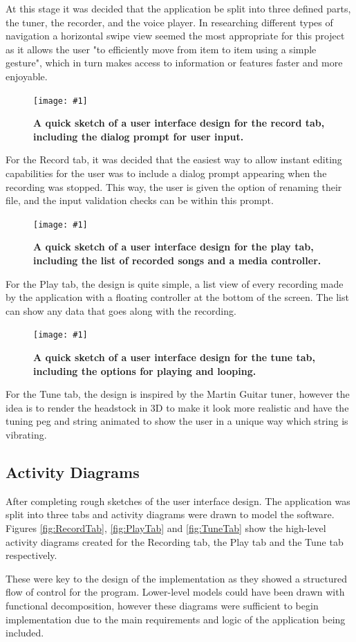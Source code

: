 \documentclass[conference]{acmsiggraph}
\newcommand{\figuremacroF}[3]{
	\begin{figure}[H] %
		\centering
		\texttt{[image: \#1]}
		\caption[#2]{\textbf{#2}}
		\label{fig:#1}
	\end{figure}
}
\begin{document}
At this stage it was decided that the application be split into three defined parts, the tuner, the recorder, and the voice player. In researching different types of navigation a horizontal swipe view seemed the most appropriate for this project as it allows the user "to efficiently move from item to item using a simple gesture", which in turn makes access to information or features faster and more enjoyable. \cite{swipeArticle}

\figuremacroF
{recordSketch}
{A quick sketch of a user interface design for the record tab, including the dialog prompt for user input.}
{1.0}

For the Record tab, it was decided that the easiest way to allow instant editing capabilities for the user was to include a dialog prompt appearing when the recording was stopped. This way, the user is given the option of renaming their file, and the input validation checks can be within this prompt. 

\figuremacroF
{playSketch}
{A quick sketch of a user interface design for the play tab, including the list of recorded songs and a media controller.}
{1.0}

For the Play tab, the design is quite simple, a list view of every recording made by the application with a floating controller at the bottom of the screen. The list can show any data that goes along with the recording.

\figuremacroF
{tuneSketch}
{A quick sketch of a user interface design for the tune tab, including the options for playing and looping.}
{1.0}

For the Tune tab, the design is inspired by the Martin Guitar tuner, however the idea is to render the headstock in 3D to make it look more realistic and have the tuning peg and string animated to show the user in a unique way which string is vibrating.

\subsection{Activity Diagrams}

After completing rough sketches of the user interface design. The application was split into three tabs and activity diagrams were drawn to model the software. Figures \ref{fig:RecordTab}, \ref{fig:PlayTab} and \ref{fig:TuneTab} show the high-level activity diagrams created for the Recording tab, the Play tab and the Tune tab respectively.

These were key to the design of the implementation as they showed a structured flow of control for the program. Lower-level models could have been drawn with functional decomposition, however these diagrams were sufficient to begin implementation due to the main requirements and logic of the application being included.
\end{document}
